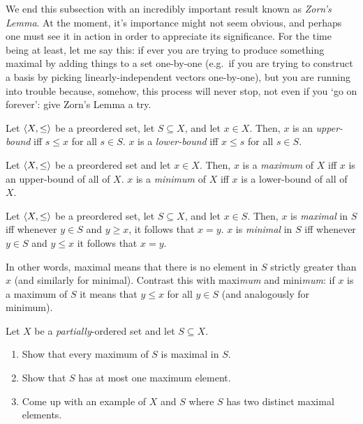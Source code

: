 We end this subsection with an incredibly important result known as \emph{Zorn's Lemma}.  At the moment, it's importance might not seem obvious, and perhaps one must see it in action in order to appreciate its significance.  For the time being at least, let me say this:  if ever you are trying to produce something maximal by adding things to a set one-by-one (e.g.~if you are trying to construct a basis by picking linearly-independent vectors one-by-one), but you are running into trouble because, somehow, this process will never stop, not even if you `go on forever':  give Zorn's Lemma a try.
\begin{dfn}
Let $\langle X,\leq\rangle$ be a preordered set, let $S\subseteq X$, and let $x\in X$.  Then, $x$ is an \emph{upper-bound} iff $s\leq x$ for all $s\in S$.  $x$ is a \emph{lower-bound} iff $x\leq s$ for all $s\in S$.
\end{dfn}
\begin{dfn}
Let $\langle X,\leq\rangle$ be a preordered set and let $x\in X$.  Then, $x$ is a \emph{maximum} of $X$ iff $x$ is an upper-bound of all of $X$.  $x$ is a \emph{minimum} of $X$ iff $x$ is a lower-bound of all of $X$.
\end{dfn}
\begin{dfn}
Let $\langle X,\leq\rangle$ be a preordered set, let $S\subseteq X$, and let $x\in S$.  Then, $x$ is \emph{maximal} in $S$ iff whenever $y\in S$ and $y\geq x$, it follows that $x=y$.  $x$ is \emph{minimal} in $S$ iff whenever $y\in S$ and $y\leq x$ it follows that $x=y$.
\begin{rmk}
In other words, maximal means that there is no element in $S$ strictly greater than $x$ (and similarly for minimal).  Contrast this with maxi\emph{mum} and mini\emph{mum}:  if $x$ is a maximum of $S$ it means that $y\leq x$ for all $y\in S$ (and analogously for minimum).
\end{rmk}
\end{dfn}
\begin{exr}
Let $X$ be a \emph{partially}-ordered set and let $S\subseteq X$.
\begin{enumerate}
\item Show that every maximum of $S$ is maximal in $S$.
\item Show that $S$ has at most one maximum element.
\item Come up with an example of $X$ and $S$ where $S$ has two distinct maximal elements.
\end{enumerate}
\end{exr}
